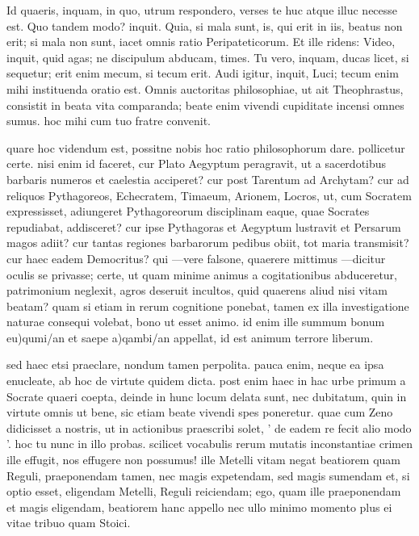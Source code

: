  Id quaeris, inquam, in quo, utrum respondero, verses te huc atque illuc necesse est. Quo tandem modo? inquit. Quia, si mala sunt, is, qui erit in iis, beatus non erit; si mala non sunt, iacet omnis ratio Peripateticorum. Et ille ridens: Video, inquit, quid agas; ne discipulum abducam, times. Tu vero, inquam, ducas licet, si sequetur; erit enim mecum, si tecum erit. Audi igitur, inquit, Luci; tecum enim mihi instituenda oratio est. Omnis auctoritas philosophiae, ut ait Theophrastus, consistit in beata vita comparanda; beate enim vivendi cupiditate incensi omnes sumus. hoc mihi cum tuo fratre convenit.

 quare hoc videndum est, possitne nobis hoc ratio philosophorum dare. pollicetur certe. nisi enim id faceret, cur Plato Aegyptum peragravit, ut a sacerdotibus barbaris numeros et caelestia acciperet? cur post Tarentum ad Archytam? cur ad reliquos Pythagoreos, Echecratem, Timaeum, Arionem, Locros, ut, cum Socratem expressisset, adiungeret Pythagoreorum disciplinam eaque, quae Socrates repudiabat, addisceret? cur ipse Pythagoras et Aegyptum lustravit et Persarum magos adiit? cur tantas regiones barbarorum pedibus obiit, tot maria transmisit? cur haec eadem Democritus? qui —vere falsone, quaerere mittimus —dicitur oculis se privasse; certe, ut quam minime animus a cogitationibus abduceretur, patrimonium neglexit, agros deseruit incultos, quid quaerens aliud nisi vitam beatam? quam si etiam in rerum cognitione ponebat, tamen ex illa investigatione naturae consequi volebat, bono ut esset animo. id enim ille summum bonum eu)qumi/an et saepe a)qambi/an appellat, id est animum terrore liberum.

 sed haec etsi praeclare, nondum tamen perpolita. pauca enim, neque ea ipsa enucleate, ab hoc de virtute quidem dicta. post enim haec in hac urbe primum a Socrate quaeri coepta, deinde in hunc locum delata sunt, nec dubitatum, quin in virtute omnis ut bene, sic etiam beate vivendi spes poneretur. quae cum Zeno didicisset a nostris, ut in actionibus praescribi solet, ' de eadem re fecit alio modo '. hoc tu nunc in illo probas. scilicet vocabulis rerum mutatis inconstantiae crimen ille effugit, nos effugere non possumus! ille Metelli vitam negat beatiorem quam Reguli, praeponendam tamen, nec magis expetendam, sed magis sumendam et, si optio esset, eligendam Metelli, Reguli reiciendam; ego, quam ille praeponendam et magis eligendam, beatiorem hanc appello nec ullo minimo momento plus ei vitae tribuo quam Stoici.

